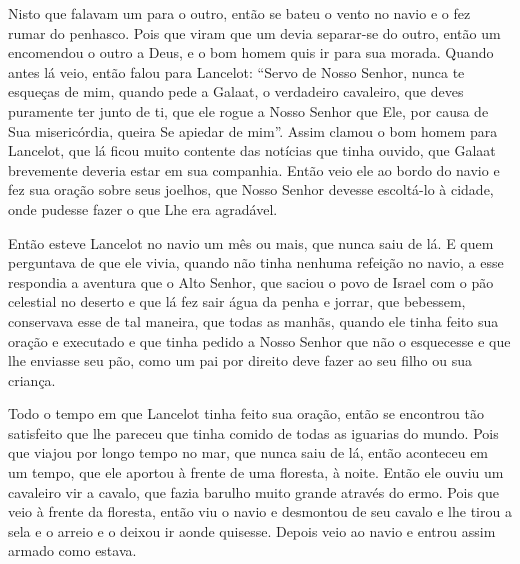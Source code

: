 Nisto que falavam um para o outro, então se bateu o vento no navio e o fez rumar
do penhasco. Pois que viram que um devia separar-se do outro, então um
encomendou o outro a Deus, e o bom homem quis ir para sua morada. Quando antes
lá veio, então falou para Lancelot: “Servo de Nosso Senhor, nunca te esqueças
de mim, quando pede a Galaat, o verdadeiro cavaleiro, que deves puramente ter
junto de ti, que ele rogue a Nosso Senhor que Ele, por causa de Sua
misericórdia, queira Se apiedar de mim”. Assim clamou o bom homem para
Lancelot, que lá ficou muito contente das notícias que tinha ouvido, que
Galaat brevemente deveria estar em sua companhia. Então veio ele ao bordo do
navio e fez sua oração sobre seus joelhos, que Nosso Senhor devesse escoltá-lo
à cidade, onde pudesse fazer o que Lhe era agradável. 

Então esteve Lancelot no navio um mês ou mais, que nunca saiu de lá. E quem
perguntava de que ele vivia, quando não tinha nenhuma refeição no navio, a esse
respondia a aventura que o Alto Senhor, que saciou o povo de Israel com o pão
celestial no deserto e que lá fez sair água da penha e jorrar, que bebessem,
conservava esse de tal maneira, que todas as manhãs, quando ele tinha feito sua
oração e executado e que tinha pedido a Nosso Senhor que não o esquecesse e que
lhe enviasse seu pão, como um pai por direito deve fazer ao seu filho ou sua
criança.

Todo o tempo em que Lancelot tinha feito sua oração, então se encontrou tão
satisfeito que lhe pareceu que tinha comido de todas as iguarias do mundo. Pois
que viajou por longo tempo no mar, que nunca saiu de lá, então aconteceu em um
tempo, que ele aportou à frente de uma floresta, à noite. Então ele ouviu um
cavaleiro vir a cavalo, que fazia barulho muito grande através do ermo. Pois
que veio à frente da floresta, então viu o navio e desmontou de seu cavalo e
lhe tirou a sela e o arreio e o deixou ir aonde quisesse. Depois veio ao navio
e entrou assim armado como estava.

